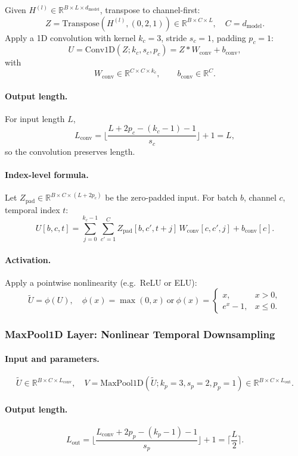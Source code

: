 \documentclass[11pt]{article}
\begin{document}
Given $H^{(l)} \in \mathbb{R}^{B\times L\times d_{\text{model}}}$,
transpose to channel-first:
\[
Z = \mathrm{Transpose}(H^{(l)}, (0,2,1)) \in \mathbb{R}^{B\times C\times L},
\quad C = d_{\text{model}}.
\]
Apply a 1D convolution with kernel $k_c=3$, stride $s_c=1$, padding $p_c=1$:
\[
U = \mathrm{Conv1D}(Z; k_c, s_c, p_c)
    = Z * W_{\text{conv}} + b_{\text{conv}},
\]
with
\[
W_{\text{conv}} \in \mathbb{R}^{C\times C\times k_c}, 
\qquad b_{\text{conv}} \in \mathbb{R}^{C}.
\]

\paragraph{Output length.}
For input length $L$,
\[
L_{\text{conv}} =
\Big\lfloor \frac{L + 2p_c - (k_c - 1) - 1}{s_c} \Big\rfloor + 1
= L,
\]
so the convolution preserves length.

\paragraph{Index-level formula.}
Let $Z_{\text{pad}}\in\mathbb{R}^{B\times C\times(L+2p_c)}$ be the zero-padded input.
For batch $b$, channel $c$, temporal index $t$:
\[
U[b,c,t] = 
\sum_{j=0}^{k_c-1}\sum_{c'=1}^{C}
Z_{\text{pad}}[b,c',t+j]\,W_{\text{conv}}[c,c',j]
+ b_{\text{conv}}[c].
\]

\paragraph{Activation.}
Apply a pointwise nonlinearity (e.g.\ ReLU or ELU):
\[
\tilde{U} = \phi(U),
\quad
\phi(x)=\max(0,x)\ \text{or}\ 
\phi(x)=\begin{cases}x,&x>0,\\ e^x-1,&x\le0.\end{cases}
\]

\subsubsection{MaxPool1D Layer: Nonlinear Temporal Downsampling}

\paragraph{Input and parameters.}
\[
\tilde{U} \in \mathbb{R}^{B\times C\times L_{\text{conv}}},
\quad
V = \mathrm{MaxPool1D}(\tilde{U}; k_p=3, s_p=2, p_p=1)
   \in \mathbb{R}^{B\times C\times L_{\text{out}}}.
\]

\paragraph{Output length.}
\[
L_{\text{out}} =
\Big\lfloor \frac{L_{\text{conv}} + 2p_p - (k_p - 1) - 1}{s_p} \Big\rfloor + 1
= \Big\lceil \frac{L}{2} \Big\rceil.
\]
\end{document}
